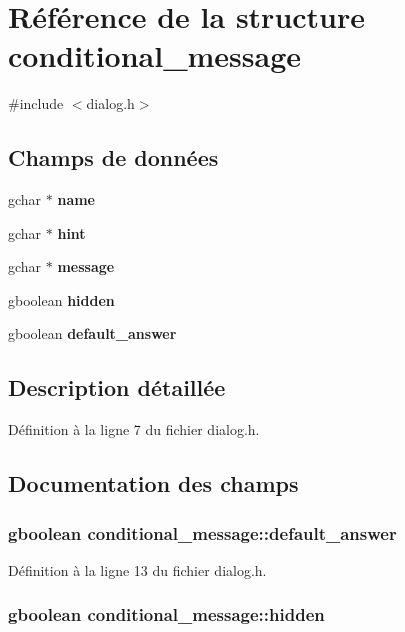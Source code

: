 \section{Référence de la structure conditional\_\-message}
\label{structconditional__message}


{\ttfamily \#include $<$dialog.h$>$}

\subsection*{Champs de données}
\begin{DoxyCompactItemize}
\item 
gchar $\ast$ {\bf name}
\item 
gchar $\ast$ {\bf hint}
\item 
gchar $\ast$ {\bf message}
\item 
gboolean {\bf hidden}
\item 
gboolean {\bf default\_\-answer}
\end{DoxyCompactItemize}


\subsection{Description détaillée}


Définition à la ligne 7 du fichier dialog.h.



\subsection{Documentation des champs}
\subsubsection[{default\_\-answer}]{\setlength{\rightskip}{0pt plus 5cm}gboolean {\bf conditional\_\-message::default\_\-answer}}\label{structconditional__message_a5d57366ec84bc24d47c0ed9caaba70c4}


Définition à la ligne 13 du fichier dialog.h.

\subsubsection[{hidden}]{\setlength{\rightskip}{0pt plus 5cm}gboolean {\bf conditional\_\-message::hidden}}\label{structconditional__message_a9aea2412afc1bcac3075ef180adf09b6}


